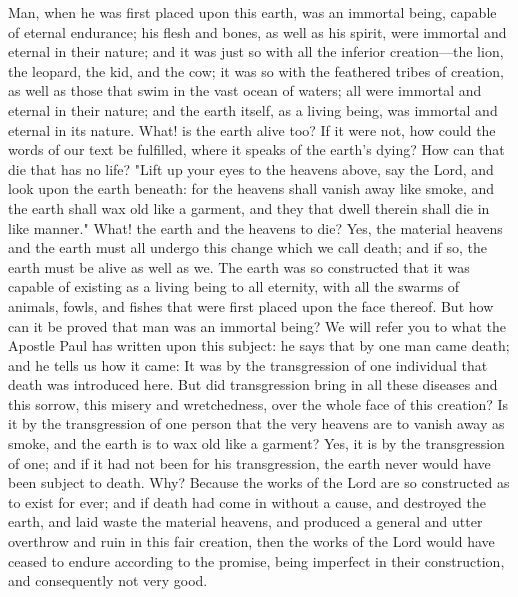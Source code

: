 Man, when he was first placed upon this earth, was an immortal being, capable of eternal
endurance; his flesh and bones, as well as his spirit, were immortal and eternal in their
nature; and it was just so with all the inferior creation—the lion, the leopard, the kid, and the
cow; it was so with the feathered tribes of creation, as well as those that swim in the vast
ocean of waters; all were immortal and eternal in their nature; and the earth itself, as a living
being, was immortal and eternal in its nature. What! is the earth alive too? If it were not, how
could the words of our text be fulfilled, where it speaks of the earth's dying? How can that
die that has no life? "Lift up your eyes to the heavens above, say the Lord, and look upon the
earth beneath: for the heavens shall vanish away like smoke, and the earth shall wax old like
a garment, and they that dwell therein shall die in like manner." What! the earth and the
heavens to die? Yes, the material heavens and the earth must all undergo this change which
we call death; and if so, the earth must be alive as well as we. The earth was so constructed
that it was capable of existing as a living being to all eternity, with all the swarms of animals,
fowls, and fishes that were first placed upon the face thereof. But how can it be proved that
man was an immortal being? We will refer you to what the Apostle Paul has written upon
this subject: he says that by one man came death; and he tells us how it came: It was by the
transgression of one individual that death was introduced here. But did transgression bring in
all these diseases and this sorrow, this misery and wretchedness, over the whole face of this
creation? Is it by the transgression of one person that the very heavens are to vanish away as
smoke, and the earth is to wax old like a garment? Yes, it is by the transgression of one; and
if it had not been for his transgression, the earth never would have been subject to death.
Why? Because the works of the Lord are so constructed as to exist for ever; and if death had
come in without a cause, and destroyed the earth, and laid waste the material heavens, and
produced a general and utter overthrow and ruin in this fair creation, then the works of the
Lord would have ceased to endure according to the promise, being imperfect in their
construction, and consequently not very good.

